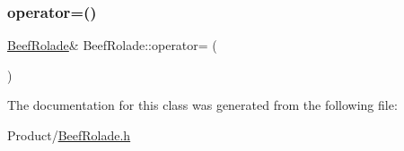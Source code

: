\subsubsection{\texorpdfstring{operator=()}{operator=()}}
{\footnotesize\ttfamily \mbox{\hyperlink{classBeefRolade}{Beef\+Rolade}}\& Beef\+Rolade\+::operator= (\begin{DoxyParamCaption}\item[{const \mbox{\hyperlink{classBeefRolade}{Beef\+Rolade}} \&}]{ }\end{DoxyParamCaption})}



The documentation for this class was generated from the following file\+:\begin{DoxyCompactItemize}
\item 
Product/\mbox{\hyperlink{BeefRolade_8h}{Beef\+Rolade.\+h}}\end{DoxyCompactItemize}
